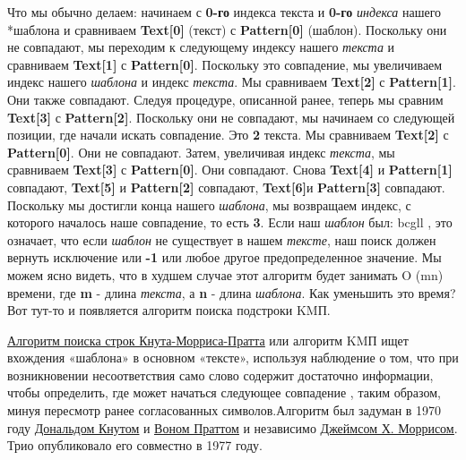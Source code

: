 Что мы обычно делаем: начинаем с \textbf{0-го} индекса текста и \textbf{0-го} \textit{индекса} нашего *шаблона и сравниваем
\textbf{Text[0]} (текст) с \textbf{Pattern[0]} (шаблон). Поскольку они не совпадают, мы переходим к следующему
индексу нашего \textit{текста} и сравниваем \textbf{Text[1]} с \textbf{Pattern[0]}. Поскольку это совпадение, мы увеличиваем
индекс нашего \textit{шаблона} и индекс \textit{текста}. Мы сравниваем \textbf{Text[2]} с \textbf{Pattern[1]}. Они также совпадают.
Следуя процедуре, описанной ранее, теперь мы сравним \textbf{Text[3]} с \textbf{Pattern[2]}. Поскольку они не
совпадают, мы начинаем со следующей позиции, где начали искать совпадение. Это  \textbf{2} текста. Мы
сравниваем \textbf{Text[2]} с \textbf{Pattern[0]}. Они не совпадают. Затем, увеличивая индекс \textit{текста}, мы сравниваем
\textbf{Text[3]} с \textbf{Pattern[0]}. Они совпадают. Снова \textbf{Text[4]} и \textbf{Pattern[1]} совпадают, \textbf{Text[5]} и \textbf{Pattern[2]}
совпадают, \textbf{Text[6]}и \textbf{Pattern[3]} совпадают. Поскольку мы достигли конца нашего \textit{шаблона}, мы
возвращаем индекс, с которого началось наше совпадение, то есть \textbf{3}. Если наш \textit{шаблон} был: bcgll %
, это
означает, что если \textit{шаблон} не существует в нашем \textit{тексте}, наш поиск должен вернуть исключение или \textbf{-1}
или любое другое предопределенное значение. Мы можем ясно видеть, что в худшем случае этот
алгоритм будет занимать O (mn) %
времени, где \textbf{m} - длина \textit{текста}, а \textbf{n} - длина \textit{шаблона}. Как уменьшить это
время? Вот тут-то и появляется алгоритм поиска подстроки KMП.
\vspace{\baselineskip}

\href{https://en.wikipedia.org/wiki/Knuth%
}
{\underline {Алгоритм поиска строк Кнута-Морриса-Пратта}}
или алгоритм KMП ищет вхождения «шаблона» в
основном «тексте», используя наблюдение о том, что при возникновении несоответствия само слово
содержит достаточно информации, чтобы определить, где может начаться следующее совпадение ,
таким образом, минуя пересмотр ранее согласованных символов.\newline Алгоритм был задуман в 1970 году
\href{https://en.wikipedia.org/wiki/Donald_Knuth}{\underline{Дональдом Кнутом}}
и \href{https://en.wikipedia.org/wiki/Vaughan_Pratt}{\underline{Воном Праттом}} и независимо \newline\href{https://en.wikipedia.org/wiki/James_H._Morris}{\underline{Джеймсом Х. Моррисом}}.
Трио опубликовало его совместно в 1977 году.
\vspace{\baselineskip}

